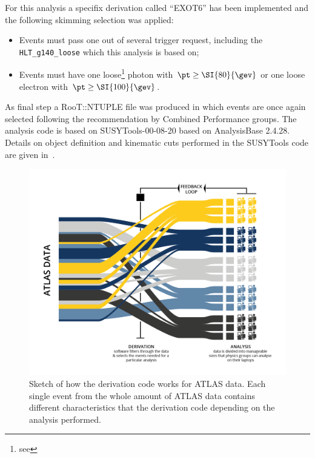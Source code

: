 For this analysis a specifix derivation called ``EXOT6'' has been implemented and the following skimming selection was applied:
\begin{itemize}
\item Events must pass one out of several trigger request, including the \verb!HLT_g140_loose! which this analysis is based on;
\item Events must have one loose\footnote{see \Sect{\ref{photons}}} photon with $\pt\ge\SI{80}{\gev}$ or one loose electron with $\pt\ge\SI{100}{\gev}$.
\end{itemize}

As final step a RooT::NTUPLE file was produced in which events are once again selected following the recommendation by Combined Performance groups. The analysis code is based on SUSYTools-00-08-20 based on AnalysisBase 2.4.28. Details on object definition and kinematic cuts performed in the SUSYTools code are given in~\cite{twiki:SUSYTools}.


\begin{figure}[t]
\centering
\includegraphics[width=.5\textwidth]{MCSample/Derivation}
\caption{Sketch of how the derivation code works for ATLAS data. Each single event from the whole amount of ATLAS data contains different characteristics that the derivation code depending on the analysis performed.}
\label{fig:derivation}
\end{figure}















